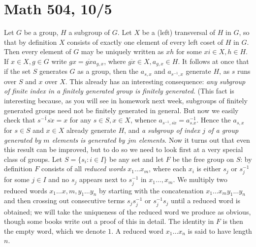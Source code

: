 \documentclass[10pt]{article}
\begin{document}
\section*{Math 504, 10/5}

Let $G$ be a group, $H$ a subgroup of $G$. Let $X$ be a (left)
transversal of $H$ in $G$, so that by definition $X$ consists of exactly
one element of every left coset of $H$ in $G$. Then every element of $G$
may be uniquely written as $xh$ for some $xi\in X,h\in H$. If $x\in
X,g\in G$ write $gx = \overline{gx}a_{g,x}$, where $\overline{gx}\in
X,a_{g,x}\in H$. It follows at once that if the set $S$ generates $G$ as
a group, then the $a_{s,x}$ and $a_{s^{-1},x}$ generate $H$, as $s$ runs
over $S$ and $x$ over $X$. This already has an interesting consequence:
{\sl any subgroup of finite index in a finitely generated group is
  finitely generated}. (This fact is interesting because, as you will
see in homework next week, subgroups of finitely generated groups need
not be finitely generated in general. But now we easily check that
$\overline{s^{-1}\overline{sx}}= x$ for any $s\in S,x\in X$, whence
$a_{s^{-1},\overline{sx}} = a_{s.x}^{-1}$. Hence the $a_{s,x}$ for $s\in
S$ and $x\in X$ already generate $H$, and {\sl a subgroup of index $j$
  of a group generated by $m$ elements is generated by $jm$ elements}.
Now it turns out that even this result can be improved, but to do so we
need to look first at a very special class of groups. Let $S=\{s_i:i\in
I\}$ be any set and let $F$ be the free group on $S$: by definition $F$
consists of all {\sl reduced words} $x_1\ldots x_m$, where each $x_i$ is
either $s_j$ or $s_j^{-1}$ for some $j\in I$ and no $s_j$ appears next
to $s_j^{-1}$ in $x_1\ldots,x_m$. We multiply two reduced words
$x_1\ldots x,m,y_1\ldots y_n$ by starting with the concatenation
$x_1\ldots x_m y_1\ldots y_n$ and then crossing out consecutive terms
$s_j s_j^{-1}$ or $s_j^{-1} s_j$ until a reduced word is obtained; we
will take the uniqueness of the reduced word we produce as obvious,
though some books write out a proof of this in detail. The identity in
$F$ is then the empty word, which we denote $1$. A reduced word
$x_1\ldots x_n$ is said to have length $n$.
\end{document}
